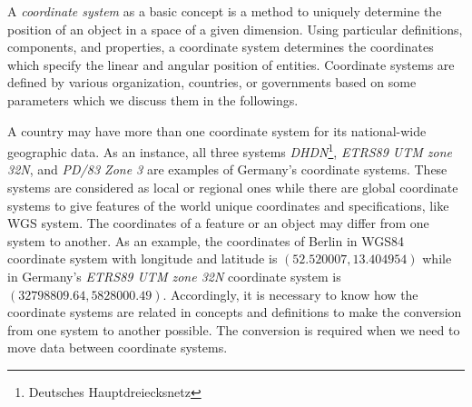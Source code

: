 \documentclass[a4paper,12pt]{article}
\begin{document}
A \emph{coordinate system} as a basic concept is a method to uniquely determine the position of an object in a space of a given dimension. Using particular definitions, components, and properties, a coordinate system determines the coordinates which specify the linear and angular position of entities. Coordinate systems are defined by various organization, countries, or governments based on some parameters which we discuss them in the followings.

A country may have more than one coordinate system for its national-wide geographic data. As an instance, all three systems \textit{DHDN}\footnote{Deutsches Hauptdreiecksnetz}, \textit{ETRS89 UTM zone 32N}, and \textit{PD/83 Zone 3} are examples of Germany's coordinate systems. These systems are considered as local or regional ones while there are global coordinate systems to give features of the world unique coordinates and specifications, like WGS system. The coordinates of a feature or an object may differ from one system to another. As an example, the coordinates of Berlin in WGS84 coordinate system with longitude and latitude is $(52.520007, 13.404954)$ while in Germany's \textit{ETRS89 UTM zone 32N} coordinate system is $(32798809.64, 5828000.49)$. Accordingly, it is necessary to know how the coordinate systems are related in concepts and definitions to make the conversion from one system to another possible. The conversion is required when we need to move data between coordinate systems.
\end{document}
